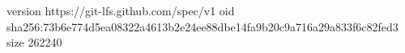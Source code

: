 version https://git-lfs.github.com/spec/v1
oid sha256:73b6e774d5ea08322a4613b2e24ee88dbe14fa9b20c9a716a29a833f6c82fed3
size 262240
